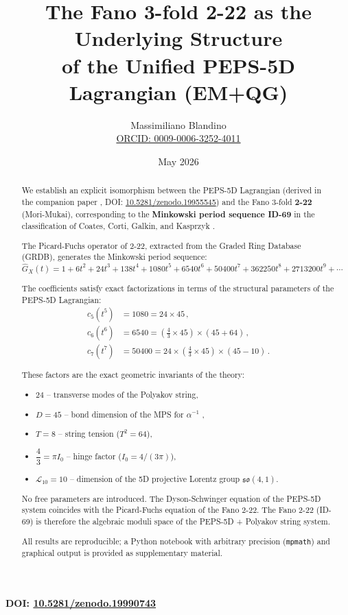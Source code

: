 \documentclass[12pt]{article}
\title{The Fano 3-fold 2-22 as the Underlying Structure \\
       of the Unified PEPS-5D Lagrangian (EM+QG)}
\author{Massimiliano Blandino \\ 
\href{https://orcid.org/0009-0006-3252-4011}{ORCID: 0009-0006-3252-4011}}
\date{May 2026}
\begin{document}
\maketitle

\begin{center}
\large\textbf{DOI: \href{https://doi.org/10.5281/zenodo.19990743}{10.5281/zenodo.19990743}}
\end{center}

\vspace{0.5cm}

\begin{abstract}
We establish an explicit isomorphism between the PEPS-5D Lagrangian
(derived in the companion paper \cite{peps5d}, DOI: \href{https://doi.org/10.5281/zenodo.19955545}{10.5281/zenodo.19955545})
and the Fano 3-fold \textbf{2-22} (Mori-Mukai), corresponding to the
\textbf{Minkowski period sequence ID-69} in the classification of
Coates, Corti, Galkin, and Kasprzyk \cite{coates2013}.

The Picard-Fuchs operator of 2-22, extracted from the Graded Ring Database
(GRDB), generates the Minkowski period sequence:
\[
\widehat{G}_X(t) = 1 + 6t^2 + 24t^3 + 138t^4 + 1080t^5 + 6540t^6 + 50400t^7 + 362250t^8 + 2713200t^9 + \cdots
\]

The coefficients satisfy exact factorizations in terms of the structural
parameters of the PEPS-5D Lagrangian:
\begin{align*}
c_5 (t^5) &= 1080 = 24 \times 45 \,, \\
c_6 (t^6) &= 6540 = \left(\frac{4}{3} \times 45\right) \times \left(45 + 64\right) \,, \\
c_7 (t^7) &= 50400 = 24 \times \left(\frac{4}{3} \times 45\right) \times \left(45 - 10\right) \, .
\end{align*}

These factors are the exact geometric invariants of the theory:
\begin{itemize}
  \item $24$ -- transverse modes of the Polyakov string,
  \item $D = 45$ -- bond dimension of the MPS for $\alpha^{-1}$ \cite{alpha_series},
  \item $T = 8$ -- string tension ($T^2 = 64$),
  \item $\dfrac{4}{3} = \pi I_0$ -- hinge factor ($I_0 = 4/(3\pi)$),
  \item $\mathcal{L}_{10} = 10$ -- dimension of the 5D projective Lorentz group $\mathfrak{so}(4,1)$.
\end{itemize}

No free parameters are introduced. The Dyson-Schwinger equation of the
PEPS-5D system coincides with the Picard-Fuchs equation of the Fano 2-22.
The Fano 2-22 (ID-69) is therefore the algebraic moduli space of the
PEPS-5D + Polyakov string system.

All results are reproducible; a Python notebook with arbitrary precision
(\texttt{mpmath}) and graphical output is provided as supplementary material.
\end{abstract}
\end{document}
